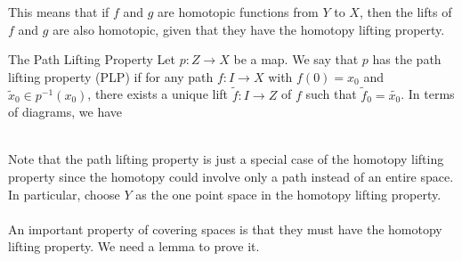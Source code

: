 \documentclass[a4paper]{article}
\begin{document}
This means that if $f$ and $g$ are homotopic functions from $Y$ to $X$, then the lifts of $f$ and $g$ are also homotopic, given that they have the homotopy lifting property. 

\begin{defn}{The Path Lifting Property}{} Let $p:Z\to X$ be a map. We say that $p$ has the path lifting property (PLP) if for any path $f:I\to X$ with $f(0)=x_0$ and $\tilde{x}_0\in p^{-1}(x_0)$, there exists a unique lift $\tilde{f}:I\to Z$ of $f$ such that $\tilde{f}_0=\tilde{x_0}$. In terms of diagrams, we have \\~\\
\end{defn}

Note that the path lifting property is just a special case of the homotopy lifting property since the homotopy could involve only a path instead of an entire space. In particular, choose $Y$ as the one point space in the homotopy lifting property. \\~\\

An important property of covering spaces is that they must have the homotopy lifting property. We need a lemma to prove it. 
\end{document}
